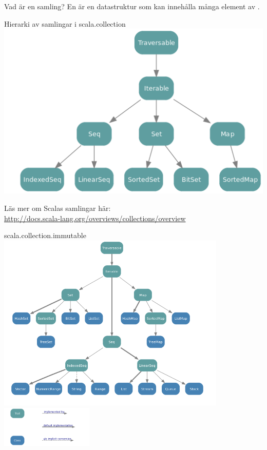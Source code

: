 
\ifkompendium\else
{}

\begin{Slide}{Vad är en samling?}
En   är en datastruktur som kan innehålla många element av .
\end{Slide}

\fi

\begin{Slide}{Hierarki av samlingar i scala.collection}
\includegraphics[width=1.0\textwidth]{../img/collection/collection-traits}
\end{Slide}

\noindent Läs mer om Scalas samlingar här: \\ 
\url{http://docs.scala-lang.org/overviews/collections/overview}

\ifkompendium\else

\begin{Slide}{scala.collection.immutable}
\includegraphics[width=0.82\textwidth]{../img/collection/collection-immutable}
\includegraphics[width=0.33\textwidth]{../img/collection/collection-legend}
\end{Slide}

